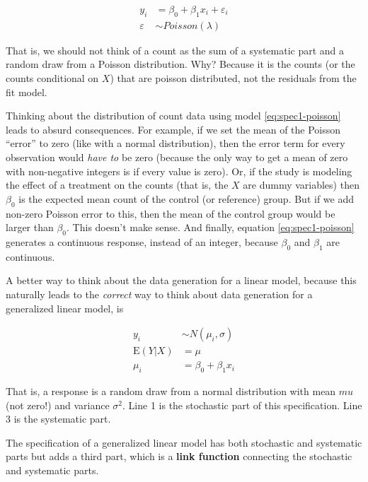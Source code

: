 \documentclass[]{book}
\begin{document}
\begin{align}
y_i &= \beta_0 + \beta_1 x_i + \varepsilon_i\\
\varepsilon &\sim Poisson(\lambda)
\label{eq:spec1-poisson}
\end{align}

That is, we should not think of a count as the sum of a systematic part
and a random draw from a Poisson distribution. Why? Because it is the
counts (or the counts conditional on \(X\)) that are poisson
distributed, not the residuals from the fit model.

Thinking about the distribution of count data using model
\eqref{eq:spec1-poisson} leads to absurd consequences. For example, if we
set the mean of the Poisson ``error'' to zero (like with a normal
distribution), then the error term for every observation would
\emph{have to} be zero (because the only way to get a mean of zero with
non-negative integers is if every value is zero). Or, if the study is
modeling the effect of a treatment on the counts (that is, the \(X\) are
dummy variables) then \(\beta_0\) is the expected mean count of the
control (or reference) group. But if we add non-zero Poisson error to
this, then the mean of the control group would be larger than
\(\beta_0\). This doesn't make sense. And finally, equation
\eqref{eq:spec1-poisson} generates a continuous response, instead of an
integer, because \(\beta_0\) and \(\beta_1\) are continuous.

A better way to think about the data generation for a linear model,
because this naturally leads to the \emph{correct} way to think about
data generation for a generalized linear model, is

\begin{align}
y_i &\sim N(\mu_i, \sigma)\\
\mathrm{E}(Y|X) &= \mu\\
\mu_i &= \beta_0 + \beta_1 x_i
\label{eq:lm-spec2}
\end{align}

That is, a response is a random draw from a normal distribution with
mean \(mu\) (not zero!) and variance \(\sigma^2\). Line 1 is the
stochastic part of this specification. Line 3 is the systematic part.

The specification of a generalized linear model has both stochastic and
systematic parts but adds a third part, which is a \textbf{link
function} connecting the stochastic and systematic parts.
\end{document}

